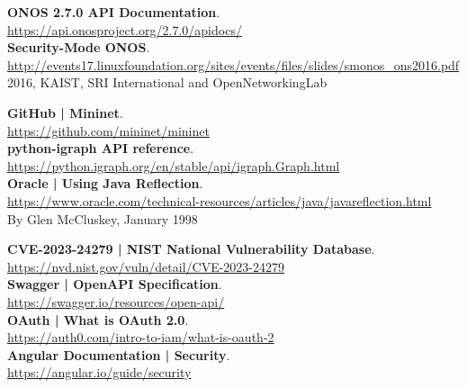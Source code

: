 \documentclass[a4paper,10pt]{memoir}
\begin{document}
{\begin{thebibliography}{9}
  \textbf{ONOS 2.7.0 API Documentation}.\\
  \href{https://api.onosproject.org/2.7.0/apidocs/}{https://api.onosproject.org/2.7.0/apidocs/}\\

  \textbf{Security-Mode ONOS}.\\
  \href{http://events17.linuxfoundation.org/sites/events/files/slides/smonos_ons2016.pdf}{http://events17.linuxfoundation.org/sites/events/files/slides/smonos\_ons2016.pdf}\\
  2016, KAIST, SRI International and OpenNetworkingLab

  \textbf{GitHub | Mininet}.\\
  \href{https://github.com/mininet/mininet}{https://github.com/mininet/mininet}\\

  \textbf{python-igraph API reference}.\\
  \href{https://python.igraph.org/en/stable/api/igraph.Graph.html}{https://python.igraph.org/en/stable/api/igraph.Graph.html}\\

  \textbf{Oracle | Using Java Reflection}.\\
  \href{https://www.oracle.com/technical-resources/articles/java/javareflection.html}{https://www.oracle.com/technical-resources/articles/java/javareflection.html}\\
  By Glen McCluskey, January 1998

  \textbf{CVE-2023-24279 | NIST National Vulnerability Database}.\\
  \href{https://nvd.nist.gov/vuln/detail/CVE-2023-24279}{https://nvd.nist.gov/vuln/detail/CVE-2023-24279}\\

  \textbf{Swagger | OpenAPI Specification}.\\
  \href{https://swagger.io/resources/open-api/}{https://swagger.io/resources/open-api/}\\

  \textbf{OAuth | What is OAuth 2.0}.\\
  \href{https://auth0.com/intro-to-iam/what-is-oauth-2}{https://auth0.com/intro-to-iam/what-is-oauth-2}\\

  \textbf{Angular Documentation | Security}.\\
  \href{https://angular.io/guide/security}{https://angular.io/guide/security}\\


\end{thebibliography}}
\end{document}
